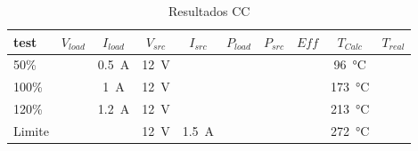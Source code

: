 
\begin{table}[H]
    \centering
    \renewcommand\theadfont{\bfseries}
    \setlength{\tabcolsep}{10pt}
    \renewcommand{\arraystretch}{1.5}
    \begin{tabular}{|l|c|c|c|c|c|c|c|c|c|}
        \hline
        test   & $V_{load}$ & $I_{load}$        & $V_{src}$      & $I_{src}$         & $P_{load}$ & $P_{src}$ & $Eff$ & $T_{Calc}$         & $T_{real}$ \\ \hline
        50\%   &            & \SI{0.5}{\ampere} & \SI{12}{\volt} &                   &            &           &       & \SI{96}{\celsius}  &            \\ \hline
        100\%  &            & \SI{1}{\ampere}   & \SI{12}{\volt} &                   &            &           &       & \SI{173}{\celsius} &            \\ \hline
        120\%  &            & \SI{1.2}{\ampere} & \SI{12}{\volt} &                   &            &           &       & \SI{213}{\celsius} &            \\ \hline
        Limite &            &                   & \SI{12}{\volt} & \SI{1.5}{\ampere} &            &           &       & \SI{272}{\celsius} &            \\
        \hline
    \end{tabular}

    \caption{Resultados CC}
    \label{tab:CcResTable}
\end{table}

